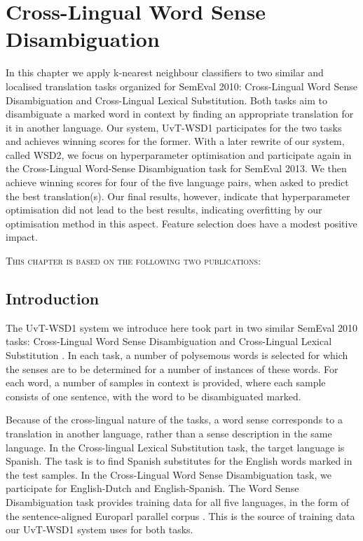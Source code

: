 \chapter{Cross-Lingual Word Sense Disambiguation}
\label{chap:clwsd}



In this chapter we apply k-nearest neighbour classifiers to two similar and
localised translation tasks organized for SemEval 2010: Cross-Lingual Word
Sense Disambiguation and Cross-Lingual Lexical Substitution.  Both tasks aim to
disambiguate a marked word in context by finding an appropriate translation for
it in another language. Our system, UvT-WSD1 participates for the two tasks and
achieves winning scores for the former. With a later rewrite of our system,
called WSD2, we focus on hyperparameter optimisation and participate again in
the Cross-Lingual Word-Sense Disambiguation task for SemEval 2013. We then
achieve winning scores for four of the five language pairs, when asked to
predict the best translation(s). Our final results, however, indicate that
hyperparameter optimisation did not lead to the best results, indicating
overfitting by our optimisation method in this aspect. Feature selection does
have a modest positive impact.


\textsc{This chapter is based on the following two publications: }
\begin{NoHyper}
\end{NoHyper}




\section{Introduction}

The UvT-WSD1 system we introduce here took part in two similar SemEval 2010
tasks: Cross-Lingual Word Sense Disambiguation \citep{WSD} and Cross-Lingual
Lexical Substitution \citep{CLLS}. In each task, a number of polysemous words is
selected for which the senses are to be determined for a number of instances of
these words. For each word, a number of samples in context is provided, where
each sample consists of one sentence, with the word to be disambiguated marked.

Because of the cross-lingual nature of the tasks, a word sense corresponds to a
translation in another language, rather than a sense description in the same
language. In the Cross-lingual Lexical Substitution task, the target language
is Spanish. The task is to find Spanish substitutes for the English words
marked in the test samples. In the Cross-Lingual Word Sense Disambiguation
task, we participate for English-Dutch and English-Spanish. The Word Sense
Disambiguation task provides training data for all five languages, in the form
of the sentence-aligned Europarl parallel corpus \citep{EUROPARL}. This is the
source of training data our UvT-WSD1 system uses for both tasks.

